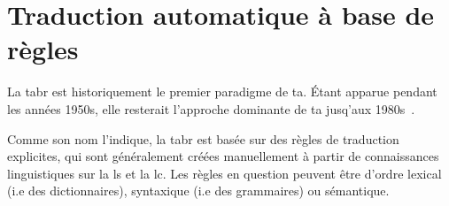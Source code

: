 \section{Traduction automatique à base de règles}
\label{sec:rbmt}

La \acrfull{tabr} est historiquement le premier paradigme de \acrshort{ta}. 
Étant apparue pendant les années 1950s, 
elle resterait l'approche dominante de \acrshort{ta} jusq'aux 1980s~\cite{routledge}.

Comme son nom l'indique, la \acrshort{tabr} est basée sur des règles de traduction explicites,
qui sont généralement créées manuellement à partir de connaissances linguistiques sur la \acrfull{ls} et la \acrfull{lc}. 
Les règles en question peuvent être d'ordre lexical (i.e des dictionnaires),
syntaxique (i.e des grammaires) ou sémantique.




